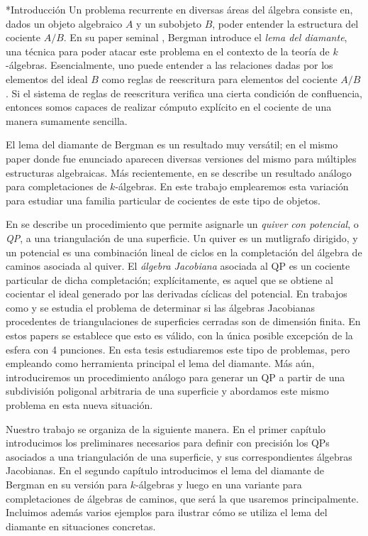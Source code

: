 \begin{chapter}*{Introducción}
Un problema recurrente en diversas áreas del álgebra consiste en, dados un objeto algebraico $A$ y un subobjeto $B$, poder entender la estructura del cociente $A/B$. En su paper seminal \cite{Ber78}, Bergman introduce el \emph{lema del diamante}, una técnica para poder atacar este problema en el contexto de la teoría de $k$-álgebras. Esencialmente, uno puede entender a las relaciones dadas por los elementos del ideal $B$ como reglas de reescritura para elementos del cociente $A/B$. Si el sistema de reglas de reescritura verifica una cierta condición de confluencia, entonces somos capaces de realizar cómputo explícito en el cociente de una manera sumamente sencilla.

El lema del diamante de Bergman es un resultado muy versátil; en el mismo paper donde fue enunciado aparecen diversas versiones del mismo para múltiples estructuras algebraicas. Más recientemente, en \cite{SAV15} se describe un resultado análogo para completaciones de $k$-álgebras. En este trabajo emplearemos esta variación para estudiar una familia particular de cocientes de este tipo de objetos.

En \cite{DWZ08} se describe un procedimiento que permite asignarle un \emph{quiver con potencial}, o \emph{QP}, a una triangulación de una superficie. Un quiver es un mutligrafo dirigido, y un potencial es una combinación lineal de ciclos en la completación del álgebra de caminos asociada al quiver. El \emph{álgebra Jacobiana} asociada al QP es un cociente particular de dicha completación; explícitamente, es aquel que se obtiene al cocientar el ideal generado por las derivadas cíclicas del potencial. En trabajos como \cite{Lad12} y \cite{TVD12} se estudia el problema de determinar si las álgebras Jacobianas procedentes de triangulaciones de superficies cerradas son de dimensión finita. En estos papers se establece que esto es válido, con la única posible excepción de la esfera con 4 punciones. En esta tesis estudiaremos este tipo de problemas, pero empleando como herramienta principal el lema del diamante. Más aún, introduciremos un procedimiento análogo para generar un QP a partir de una subdivisión poligonal arbitraria de una superficie y abordamos este mismo problema en esta nueva situación.

Nuestro trabajo se organiza de la siguiente manera. En el primer capítulo introducimos los preliminares necesarios para definir con precisión los QPs asociados a una triangulación de una superficie, y sus correspondientes álgebras Jacobianas. En el segundo capítulo introducimos el lema del diamante de Bergman en su versión para $k$-álgebras y luego en una variante para completaciones de álgebras de caminos, que será la que usaremos principalmente. Incluimos además varios ejemplos para ilustrar cómo se utiliza el lema del diamante en situaciones concretas.


\end{chapter}
